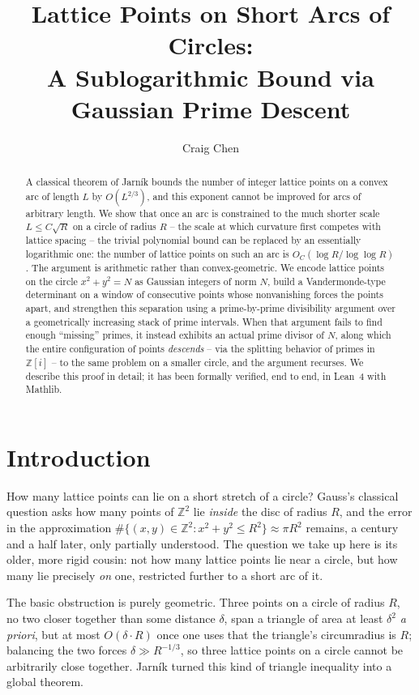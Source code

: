 \documentclass[11pt]{amsart}
\title[Lattice Points on Short Arcs of Circles]{Lattice Points on Short Arcs of Circles:\\ A Sublogarithmic Bound via Gaussian Prime Descent}
\author{Craig Chen}
\date{}
\theoremstyle{definition}
\theoremstyle{remark}
\newcommand{\Z}{\mathbb{Z}}
\begin{document}
\begin{abstract}
A classical theorem of Jarn\'{i}k bounds the number of integer lattice points on a convex arc of length $L$ by $O(L^{2/3})$, and this exponent cannot be improved for arcs of arbitrary length. We show that once an arc is constrained to the much shorter scale $L \le C\sqrt{R}$ on a circle of radius $R$ -- the scale at which curvature first competes with lattice spacing -- the trivial polynomial bound can be replaced by an essentially logarithmic one: the number of lattice points on such an arc is $O_C(\log R / \log\log R)$. The argument is arithmetic rather than convex-geometric. We encode lattice points on the circle $x^2+y^2=N$ as Gaussian integers of norm $N$, build a Vandermonde-type determinant on a window of consecutive points whose nonvanishing forces the points apart, and strengthen this separation using a prime-by-prime divisibility argument over a geometrically increasing stack of prime intervals. When that argument fails to find enough ``missing'' primes, it instead exhibits an actual prime divisor of $N$, along which the entire configuration of points \emph{descends} -- via the splitting behavior of primes in $\Z[i]$ -- to the same problem on a smaller circle, and the argument recurses. We describe this proof in detail; it has been formally verified, end to end, in Lean~4 with Mathlib.
\end{abstract}

\maketitle

\section{Introduction}

How many lattice points can lie on a short stretch of a circle? Gauss's classical question asks how many points of $\Z^2$ lie \emph{inside} the disc of radius $R$, and the error in the approximation $\#\{(x,y)\in\Z^2 : x^2+y^2\le R^2\}\approx \pi R^2$ remains, a century and a half later, only partially understood. The question we take up here is its older, more rigid cousin: not how many lattice points lie near a circle, but how many lie precisely \emph{on} one, restricted further to a short arc of it.

The basic obstruction is purely geometric. Three points on a circle of radius $R$, no two closer together than some distance $\delta$, span a triangle of area at least $\delta^2$ \emph{a priori}, but at most $O(\delta \cdot R)$ once one uses that the triangle's circumradius is $R$; balancing the two forces $\delta \gg R^{-1/3}$, so three lattice points on a circle cannot be arbitrarily close together. Jarn\'{i}k turned this kind of triangle inequality into a global theorem.
\end{document}
